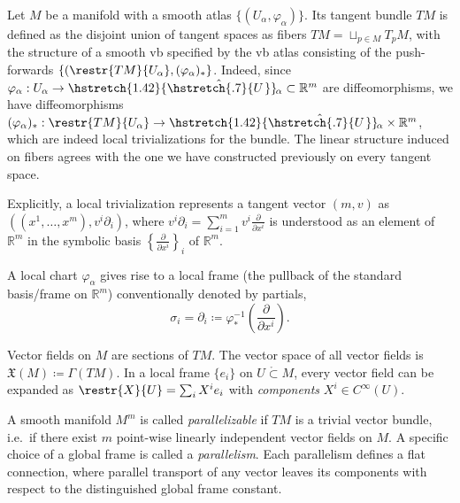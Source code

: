 \documentclass[english,letterpaper]{article}%
\numberwithin{equation}{section}
\numberwithin{figure}{section}
\numberwithin{table}{section}
\theoremstyle{definition}
\theoremstyle{definition}
\theoremstyle{definition}
\theoremstyle{plain}
\theoremstyle{plain}
\theoremstyle{plain}
\theoremstyle{plain}
\theoremstyle{remark}
\theoremstyle{remark}
\newcommand{\fX}{\mathfrak{X}}
\newcommand\wh[1]{\hstretch{1.42}{\hat{\hstretch{.7}{#1\mkern2mu}}}\mkern-2mu} %
\begin{document}
\begin{defn}
Let $M$ be a manifold with a smooth atlas $\{(U_\alpha,\varphi_\alpha)\}$. Its tangent bundle $TM$ is defined as the disjoint union of tangent spaces as fibers $TM=\sqcup_{p\in M} T_p M$, with the structure of a smooth \gls{vb} specified by the \gls{vb} atlas consisting of the push-forwards $\{(\restr{TM}{U_\alpha},(\varphi_\alpha)_\ast\}$. Indeed, since $\varphi_\alpha:U_\alpha\to \wh U_\alpha \subset \mathbb{R}^m$ are diffeomorphisms, we have diffeomorphisms $(\varphi_\alpha)_\ast:\restr{TM}{U_\alpha}\to \wh U_\alpha\times \mathbb{R}^m$, which are indeed local trivializations for the bundle. The linear structure induced on fibers agrees with the one we have constructed previously on every tangent space.
\end{defn}

Explicitly, a local trivialization represents a tangent vector $(m,v)$ as $((x^1,\ldots,x^m),v^i\partial_i)$, where $v^i\partial_i=\sum_{i=1}^m v^i\frac{\partial}{\partial x^i}$ is understood as an element of $\mathbb{R}^m$ in the symbolic basis $\left\{\frac{\partial}{\partial x^i}\right\}_i$ of $\mathbb{R}^m$.

A local chart $\varphi_\alpha$ gives rise to a local frame (the pullback of the standard basis/frame on $\mathbb{R}^m$) conventionally denoted by partials, \[\sigma_i=\partial_i\coloneqq \varphi_\ast^{-1}\left(\frac{\partial}{\partial x^i}\right).\]

\begin{defn}
Vector fields on $M$ are sections of $TM$. The vector space of all vector fields is $\fX(M)\coloneqq \Gamma(TM)$. In a local frame $\{e_i\}$ on $U\mathring{\subset}M$, every vector field can be expanded as $\restr{X}{U}=\sum_i X^i e_i$ with \emph{components} $X^i\in C^\infty(U)$.
\end{defn}

\begin{defn}[Parallelism]
A smooth manifold $M^m$ is called \emph{parallelizable} if $TM$ is a trivial vector bundle, i.e.\ if there exist $m$ point-wise linearly independent vector fields on $M$. A specific choice of a global frame is called a \emph{parallelism}. Each parallelism defines a flat connection, where parallel transport of any vector leaves its components with respect to the distinguished global frame constant.
\end{defn}
\end{document}
